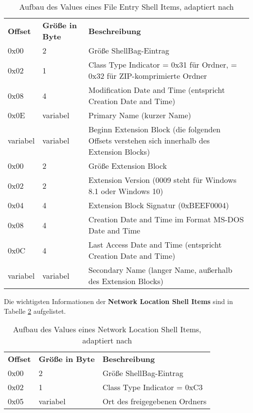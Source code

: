 \begin{longtable}{|p{}|p{}|p{}|}
	\caption{Aufbau des Values eines File Entry Shell Items, adaptiert nach \cite{shelltype}} \label{fes} \vspace{1em} \\
	\hline
	\cellcolor{gray!25}\textbf{Offset} & \cellcolor{gray!25}\textbf{Größe in Byte} & \cellcolor{gray!25}\textbf{Beschreibung} \\
	\hline
	0x00 & 2 & Größe ShellBag-Eintrag\\
	\hline
	0x02 & 1 & Class Type Indicator = 0x31 für Ordner, = 0x32 für ZIP-komprimierte Ordner \\
	\hline
	0x08 & 4 & Modification Date and Time (entspricht Creation Date and Time) \\
	\hline
	0x0E & variabel & Primary Name (kurzer Name) \\
	\hline
	variabel & variabel & Beginn Extension Block (die folgenden Offsets verstehen sich innerhalb des Extension Blocks)\\
	\hline
	0x00 & 2 & Größe Extension Block \\
	\hline
	0x02 & 2 & Extension Version (0009 steht für Windows 8.1 oder Windows 10) \\
	\hline
	0x04 & 4 & Extension Block Signatur (0xBEEF0004) \\
	\hline
	0x08 & 4 & Creation Date and Time im Format MS-DOS Date and Time \\
	\hline
	0x0C & 4 & Last Access Date and Time (entspricht Creation Date and Time)\\
	\hline
	variabel & variabel & Secondary Name (langer Name, außerhalb des Extension Blocks)\\
	\hline
\end{longtable}
\vspace{1em}
Die wichtigsten Informationen der \textbf{Network Location Shell Items} sind in Tabelle \ref{netw} aufgelistet.

\begin{longtable}{|p{}|p{}|p{}|}
	\caption{Aufbau des Values eines Network Location Shell Items, adaptiert nach \cite{shelltype}} \label{netw} \vspace{1em} \\
	\hline
	\cellcolor{gray!25}\textbf{Offset} & \cellcolor{gray!25}\textbf{Größe in Byte} & \cellcolor{gray!25}\textbf{Beschreibung} \\
	\hline
	0x00 & 2 & Größe ShellBag-Eintrag\\
	\hline
	0x02 & 1 & Class Type Indicator = 0xC3 \\
	\hline
	0x05 & variabel & Ort des freigegebenen Ordners \\
	\hline
\end{longtable}
\vspace{1em}





